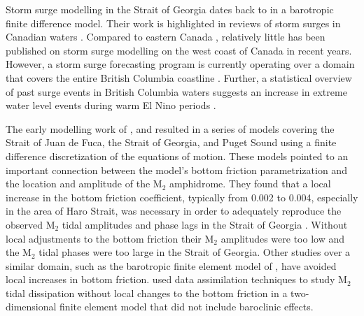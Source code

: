 \documentclass{tATO2e}
\begin{document}
Storm surge modelling in the Strait of Georgia dates back to \citet{crean1988mathematical} in a barotropic finite difference model. Their work is highlighted in reviews of storm surges in Canadian waters \citep{murty1995storm, danard2003storm}.  Compared to eastern Canada \citep{gray1984preliminary, bernier2006predicting,bobanovic2006forecasting, bernier2007tide, bernier2010tide}, relatively little has been published on storm surge modelling on the west coast of Canada in recent years. However, a storm surge forecasting program is currently operating over a domain that covers the entire British Columbia coastline \citep{StormBC}. Further, a statistical overview of past surge events in British Columbia waters suggests an increase in extreme water level events during warm El Nino periods \citep{abeys2011extreme}.

The early modelling work of \citet{crean1988mathematical}, \citet{crean1988numerical} and \citet{stronach1993update} resulted in a series of models covering the Strait of Juan de Fuca, the Strait of Georgia, and Puget Sound using a finite difference discretization of the equations of motion. %
These models pointed to an important connection between the model's bottom friction parametrization and the location and amplitude of the M$_2$ amphidrome. They found that a local increase in the bottom friction coefficient, typically from 0.002 to 0.004, especially in the area of Haro Strait, was necessary in order to adequately reproduce the observed M$_2$ tidal amplitudes and phase lags in the Strait of Georgia \citep{stronach1993update}. Without local adjustments to the bottom friction their M$_2$ amplitudes were too low and the M$_2$ tidal phases were too large in the Strait of Georgia.  Other studies over a similar domain, such as the barotropic finite element model of \citet{foreman1995tidal}, have avoided local increases in bottom friction. \citet{foreman2004m} used data assimilation techniques to study M$_2$ tidal dissipation without local changes to the bottom friction in a two-dimensional finite element model that did not include baroclinic effects. 
\end{document}
